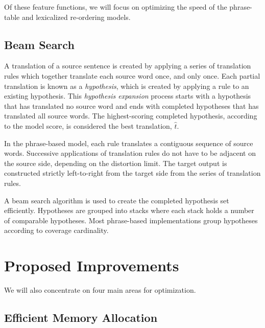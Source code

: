 \documentclass[]{article}
\begin{document}
Of these feature functions, we will focus on optimizing the speed of the phrase-table and lexicalized re-ordering models.


\subsection{Beam Search}

A translation of a source sentence is created by applying a series of translation rules which together translate each source word once, and only once. Each partial translation is known as a \emph{hypothesis}, which is created by applying a rule to an existing hypothesis. This \emph{hypothesis expansion} process starts with a hypothesis that has translated no source word and ends with completed hypotheses that has translated all source words. The highest-scoring completed hypothesis, according to the model score, is considered the best translation, $\hat{t} $.

In the phrase-based model, each rule translates a contiguous sequence of source words. Successive applications of translation rules do not have to be adjacent on the source side, depending on the distortion limit. The target output is constructed strictly left-to-right from the target side from the series of translation rules. 

A beam search algorithm is used to create the completed hypothesis set efficiently. Hypotheses are grouped into stacks where each stack holds a number of comparable hypotheses. Most phrase-based implementations group hypotheses according to coverage cardinality. %

\section{Proposed Improvements}
\label{sec:Proposed Improvements}

We will also concentrate on four main areas for optimization.

\subsection{Efficient Memory Allocation}
\end{document}
